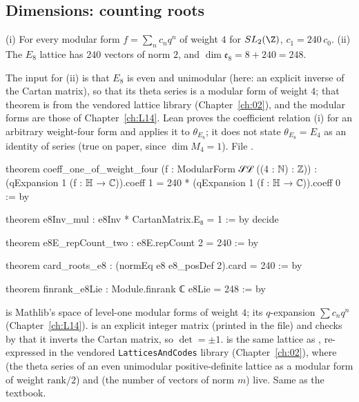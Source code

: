 \subsection{Dimensions: counting roots}

\begin{theorem}[$\dim\mathfrak e_8=248$, from $\theta_{E_8}=E_4$]\label{l23:thm:e8dim}
(i) For every modular form $f=\sum_nc_nq^n$ of weight $4$ for $SL_2(\Z)$, $c_1=240\,c_0$. (ii) The $E_8$ lattice has $240$ vectors of
norm $2$, and $\dim\mathfrak e_8=8+240=248$.
\end{theorem}
\noindent The input for (ii) is that $E_8$ is even and unimodular (here: an explicit inverse of the Cartan matrix), so that its theta
series is a modular form of weight $4$; that theorem is from the vendored lattice library (Chapter~\ref{ch:02}), and the modular forms are
those of Chapter~\ref{ch:L14}. Lean proves the coefficient relation (i) for an arbitrary weight-four form and applies it to
$\theta_{E_8}$; it does not state $\theta_{E_8}=E_4$ as an identity of series (true on paper, since $\dim M_4=1$).
\noindent File .
\begin{leancode}
theorem coeff_one_of_weight_four (f : ModularForm 𝒮ℒ ((4 : ℕ) : ℤ)) :
    (qExpansion 1 (f : ℍ → ℂ)).coeff 1 = 240 * (qExpansion 1 (f : ℍ → ℂ)).coeff 0 := by

theorem e8Inv_mul : e8Inv * CartanMatrix.E₈ = 1 := by decide

theorem e8E_repCount_two : e8E.repCount 2 = 240 := by

theorem card_roots_e8 : (normEq e8 e8_posDef 2).card = 240 := by

theorem finrank_e8Lie : Module.finrank ℂ e8Lie = 248 := by
\end{leancode}

\begin{dictionary}
 is Mathlib's space of level-one modular forms of weight $4$;  its $q$-expansion
$\sum c_nq^n$ (Chapter~\ref{ch:L14}).  is an explicit integer matrix (printed in the file) and  checks
by  that it inverts the Cartan matrix, so $\det=\pm1$.  is the same lattice as , re-expressed in the
vendored \texttt{LatticesAndCodes} library (Chapter~\ref{ch:02}), where  (the theta series of an even
unimodular positive-definite lattice as a modular form of weight $\mathrm{rank}/2$) and  (the number of vectors of
norm $m$) live. Same as the textbook.
\end{dictionary}

